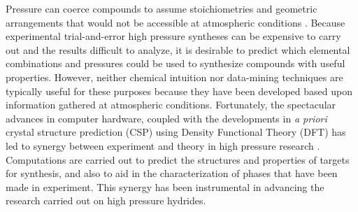 \documentclass[12pt,letterpaper,oneside]{article}
\begin{document}
Pressure can coerce compounds to assume stoichiometries and geometric arrangements that would not be accessible at atmospheric conditions  \cite{Hemley:2000,Song:2013a,Grochala:2007a,Goncharov:2013b,Bhardwaj:2012a,Dubrovinsky:2013a,McMillan:2013a,Klug:2011a,Naumov:2014a,Zurek:2014i,Zurek:2016b,Hermann-lip}.  Because experimental trial-and-error high pressure syntheses can be expensive to carry out and the results difficult to analyze, it is desirable to predict which elemental combinations and pressures could be used to synthesize compounds with useful properties. However, neither chemical intuition nor data-mining techniques are typically useful for these purposes because they have been developed based upon information gathered at atmospheric conditions. Fortunately, the spectacular advances in computer hardware, coupled with the developments in \emph{a priori} crystal structure prediction (CSP) using Density Functional Theory  (DFT) \cite{Zurek:2014d,woodley:2008a,Schon:2010a,revard,oganov:2010a,Jansen:2015a,uspex5} has led to synergy between experiment and theory in high pressure research \cite{Zurek:2014i,Zhang:2017,Wang:2014a,random1,random3}. Computations are carried out to predict the structures and properties of targets for synthesis, and also to aid in the characterization of phases that have been made in experiment. This synergy has been instrumental in advancing the research carried out on high pressure hydrides.
\end{document}
